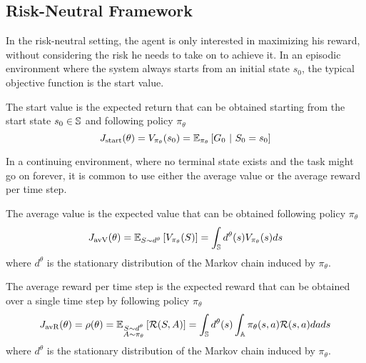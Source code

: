 \subsection{Risk-Neutral Framework}
In the risk-neutral setting, the agent is only interested in maximizing his reward, without considering the risk he needs to take on to achieve it. In an episodic environment where the system always starts from an initial state $s_0$, the typical objective function is the start value.
\begin{definition}
	The start value is the expected return that can be obtained starting from the start state $s_0 \in \S$ and following policy $\pi_\theta$
	\begin{equation}
		J_{\text{start}}(\theta) = V_{\pi_\theta}(s_0) = \E[\pi_\theta]{G_0\ |\
		   S_0 = s_0}
	\end{equation}
\end{definition}
In a continuing environment, where no terminal state exists and the task might go on forever, it is common to use either the average value or the average reward per time step.
\begin{definition}
	The average value is the expected value that can be obtained following policy $\pi_\theta$ 
	\begin{equation}
		J_{\text{avV}}(\theta) = \E[S \sim d^{\theta}]{V_{\pi_\theta}(S)} = \int_\S
		d^{\theta}(s) V_{\pi_\theta}(s) ds
	\end{equation}
	where $d^\theta$ is the stationary distribution of the Markov chain induced by $\pi_\theta$.	
\end{definition}
\begin{definition}
	The average reward per time step is the expected reward that can be
	obtained over a single time step by following policy $\pi_\theta$ 
	\begin{equation}
		J_{\text{avR}}(\theta) = \rho(\theta) = \E[\substack{S \sim d^{\theta}\\A \sim \pi_\theta}]{\calR(S,A)} 
		= \int_\S d^{\theta}(s) \int_\A \pi_\theta(s,a) \calR(s,a) da ds
	\end{equation}
	where $d^\theta$ is the stationary distribution of the Markov chain induced by $\pi_\theta$.
\end{definition}

